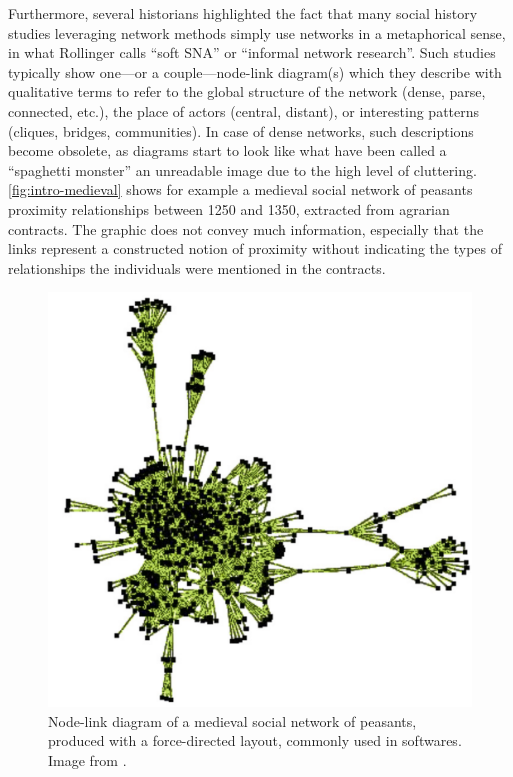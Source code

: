 Furthermore, several historians highlighted the fact that many social history studies leveraging network methods simply use networks in a metaphorical sense, in what Rollinger calls ``soft SNA'' or ``informal network research''\cite{rollingerProlegomenaProblemsPerspectives2020}.
Such studies typically show one---or a couple---node-link diagram(s) which they describe with qualitative terms\cite{lemercierQuantitativeMethodsHumanities2019} to refer to the global structure of the network (dense, parse, connected, etc.), the place of actors (central, distant), or interesting patterns (cliques, bridges, communities).
In case of dense networks, such descriptions become obsolete, as diagrams start to look like what have been called a ``spaghetti monster''\cite{collarNetworksArchaeologyPhenomena2015, lemercierQuantitativeMethodsHumanities2019} \ie an unreadable image due to the high level of cluttering.
\autoref{fig:intro-medieval} shows for example a medieval social network of peasants proximity relationships between 1250 and 1350, extracted from agrarian contracts.
The graphic does not convey much information, especially that the links represent a constructed notion of proximity without indicating the types of relationships the individuals were mentioned in the contracts.

\begin{figure}[!ht]
    \centering %
    \includegraphics[width=1\textwidth]{static/figures/RelatedWork/medievalNetwork}
    \caption{Node-link diagram of a medieval social network of peasants, produced with a force-directed layout, commonly used in \sna softwares.  Image from \cite{bouletBatchKernelSOM2008}.}
    \label{fig:intro-medieval}
\end{figure}

